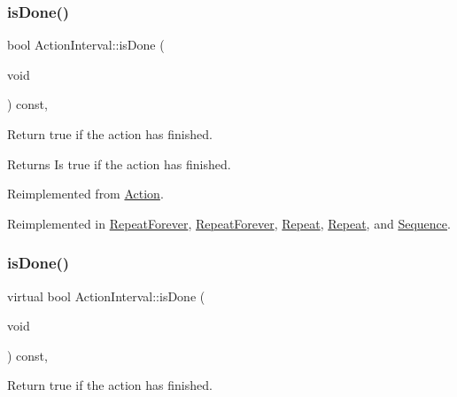 \subsubsection{\texorpdfstring{is\+Done()}{isDone()}\hspace{0.1cm}{\footnotesize\ttfamily [1/2]}}
{\footnotesize\ttfamily bool Action\+Interval\+::is\+Done (\begin{DoxyParamCaption}\item[{void}]{ }\end{DoxyParamCaption}) const\hspace{0.3cm}{\ttfamily [override]}, {\ttfamily [virtual]}}

Return true if the action has finished.

\begin{DoxyReturn}{Returns}
Is true if the action has finished. 
\end{DoxyReturn}


Reimplemented from \hyperlink{classAction_a9b5dd627540a85f89f3e82acd46b7772}{Action}.



Reimplemented in \hyperlink{classRepeatForever_a5bae9a12b19d0c39d2a8a416bc68b1db}{Repeat\+Forever}, \hyperlink{classRepeatForever_a373f8961c015a1afa61c293ce787382c}{Repeat\+Forever}, \hyperlink{classRepeat_a2efd4a590fb52dbc862b1e086509b87a}{Repeat}, \hyperlink{classRepeat_a01f8323eda5c46d6f103e8f8c5027f30}{Repeat}, and \hyperlink{classSequence_a2f331fff9e2ab6e63569f55615a1c03e}{Sequence}.

\mbox{\label{classActionInterval_a2a62feefec443d8a99c644fd5f3a5d7e}} 
\subsubsection{\texorpdfstring{is\+Done()}{isDone()}\hspace{0.1cm}{\footnotesize\ttfamily [2/2]}}
{\footnotesize\ttfamily virtual bool Action\+Interval\+::is\+Done (\begin{DoxyParamCaption}\item[{void}]{ }\end{DoxyParamCaption}) const\hspace{0.3cm}{\ttfamily [override]}, {\ttfamily [virtual]}}

Return true if the action has finished.

